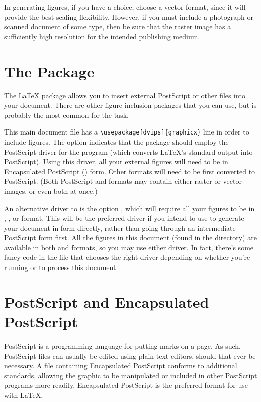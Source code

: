 In generating figures, if you have a choice, choose a vector format,
since it will provide the best scaling flexibility.  However, if you
must include a photograph or scanned document of some type, then be
sure that the raster image has a sufficiently high resolution for the
intended publishing medium.

\section{The  Package}
The \LaTeX{} package  allows you to insert external
PostScript or other files into your document.  There are other
figure-inclusion packages that you can use, but  is
probably the most common for the task.

This main document file has a \verb|\usepackage[dvips]{graphicx}| line
in order to include figures.  The option  indicates that
the  package should employ the PostScript driver for the
program  (which converts \LaTeX's standard 
output into PostScript).  Using this driver, all your external figures
will need to be in Encapsulated PostScript () form.  Other formats
will need to be first converted to PostScript.  (Both PostScript and
 formats may contain either raster or vector images, or even
both at once.)

An alternative driver to  is the option , which
will require all your figures to be in , , or
 format.  This will be the preferred driver if you intend to
use  to generate your document in  form
directly, rather than going through an intermediate PostScript form
first.  All the figures in this document (found in the 
directory) are available in both  and  formats, so
you may use either driver.  In fact, there's some fancy code in the
 file that chooses the right driver depending on whether
you're running  or  to process this document.

\section{PostScript and Encapsulated PostScript}
PostScript is a programming language for putting marks on a page.  As
such, PostScript files can usually be edited using plain text editors,
should that ever be necessary.  A file containing Encapsulated
PostScript conforms to additional standards, allowing the graphic to
be manipulated or included in other PostScript programs more readily.
Encapsulated PostScript is the preferred format for use with \LaTeX.

